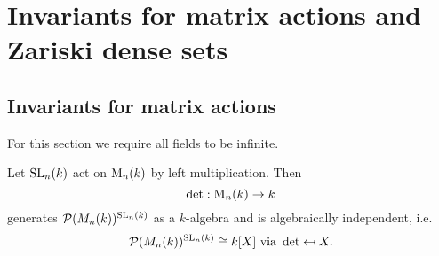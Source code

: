 \chapter{Invariants for matrix actions and Zariski dense sets}





\section{Invariants for matrix actions}
For this section we require all fields to be infinite.


\begin{thrm}
 Let $\operatorname{SL}_n(k)$ act on $\operatorname{M}_n(k)$ by left multiplication. Then
 \[
  \det : \operatorname{M}_n(k) \to k
 \]
 generates $\mathcal{P}(M_n(k))^{\operatorname{SL}_n(k)}$ as a $k$-algebra and is algebraically independent, i.e.
 \[
  \mathcal{P}(M_n(k))^{\operatorname{SL}_n(k)} \cong k[X] \text{ via } \det \mapsfrom X.
 \]
\end{thrm}
